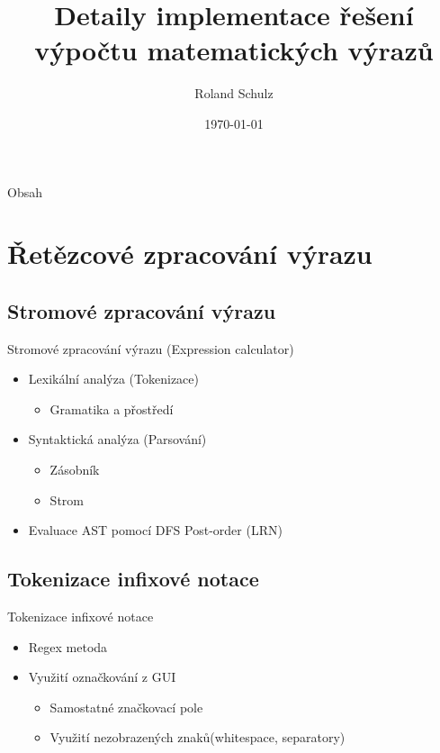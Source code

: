 \documentclass{beamer}
\title{Detaily implementace řešení výpočtu matematických výrazů}
\date{\today}
\author{Roland Schulz}
\begin{document}
\maketitle
\begin{frame}{Obsah}
    \tableofcontents
\end{frame}
\section{Řetězcové zpracování výrazu}
\subsection{Stromové zpracování výrazu}
\begin{frame}{Stromové zpracování výrazu (Expression calculator)}
    \begin{itemize}
        \item{Lexikální analýza (Tokenizace)}
            \begin{itemize} 
                \item{Gramatika a přostředí}
            \end{itemize}
        \item{Syntaktická analýza (Parsování)}
            \begin{itemize} 
                \item{Zásobník}
                \item{Strom}
            \end{itemize}
        \item{Evaluace AST pomocí DFS Post-order (LRN)}
    \end{itemize}
\end{frame}

\subsection{Tokenizace infixové notace}
\begin{frame}{Tokenizace infixové notace}
    \begin{itemize}
        \item{Regex metoda}
        \item{Využití označkování z GUI}
            \begin{itemize}
                \item{Samostatné značkovací pole}
                \item{Využití nezobrazených znaků(whitespace, separatory)}
            \end{itemize}
    \end{itemize}
\end{frame}
\end{document}
